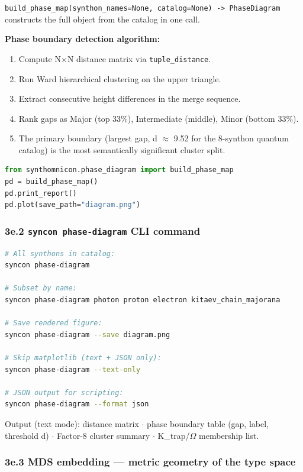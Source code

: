 \documentclass[12pt,a4paper]{article}
\begin{document}
\texttt{build\_phase\_map(synthon\_names=None, catalog=None) -\textgreater{} PhaseDiagram} constructs the full object from the catalog in one call.

\textbf{Phase boundary detection algorithm:}

\begin{enumerate}
    \item Compute N$\times$N distance matrix via \texttt{tuple\_distance}.
    \item Run Ward hierarchical clustering on the upper triangle.
    \item Extract consecutive height differences in the merge sequence.
    \item Rank gaps as Major (top 33\%), Intermediate (middle), Minor (bottom 33\%).
    \item The primary boundary (largest gap, d $\approx$ 9.52 for the 8-synthon quantum catalog) is the most semantically significant cluster split.
\end{enumerate}

\begin{lstlisting}[language=Python]
from synthomnicon.phase_diagram import build_phase_map
pd = build_phase_map()
pd.print_report()
pd.plot(save_path="diagram.png")
\end{lstlisting}

\subsubsection{3e.2 \texttt{syncon phase-diagram} CLI command}

\begin{lstlisting}[language=bash]
# All synthons in catalog:
syncon phase-diagram

# Subset by name:
syncon phase-diagram photon proton electron kitaev_chain_majorana

# Save rendered figure:
syncon phase-diagram --save diagram.png

# Skip matplotlib (text + JSON only):
syncon phase-diagram --text-only

# JSON output for scripting:
syncon phase-diagram --format json
\end{lstlisting}

Output (text mode): distance matrix $\cdot$ phase boundary table (gap, label, threshold d) $\cdot$ Factor-8 cluster summary $\cdot$ K\_trap/$\Omega$ membership list.

\subsubsection{3e.3 MDS embedding --- metric geometry of the type space}
\end{document}
